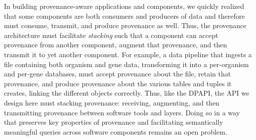 \documentclass[10pt]{article}
\begin{document}
In building provenance-aware applications and components, we quickly
realized that some components are both consumers and producers of
data and therefore must consume, transmit, and produce provenance
as well.
Thus, the provenance architecture must facilitate \emph{stacking} such that
a component can accept provenance from another component, augment that
provenance, and then transmit it to yet another component.
For example, a data pipeline that ingests a file containing both
organism and gene data,
transforming it into a per-organism and per-gene databases,
must accept provenance about the file, retain that provenance,  and
produce provenance about the various tables and tuples it creates,
linking the different objects correctly.
Thus, like the DPAPI, the API we design here must stacking provenance:
receiving, augmenting, and then transmitting provenance between
software tools and layers.
Doing so in a way that preserves key properties of provenance and
facilitating semantically meaningful queries across software
components remains an open problem.



\end{document}
